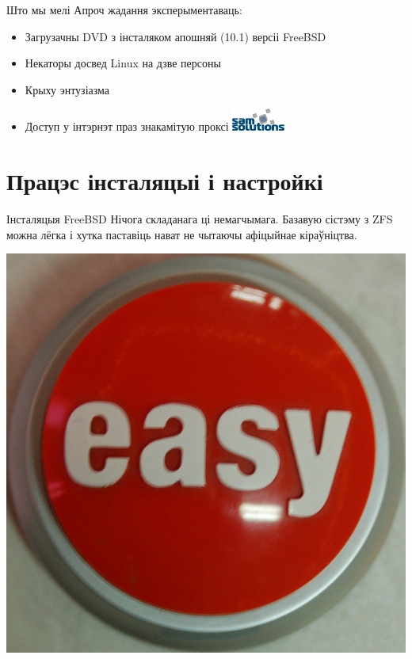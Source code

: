 \documentclass[ignorenonframetext,hyperref={pdftex,unicode}]{beamer}
\begin{document}
\begin{frame}{Што мы мелі} 
	Апроч жадання эксперыментаваць: \pause
	\begin{itemize}
		\item Загрузачны DVD з інсталяком апошняй (10.1) версіі FreeBSD \pause
		\item Некаторы досвед Linux на дзве персоны \pause
		\item Крыху энтузіазма \pause
		\item Доступ у інтэрнэт праз знакамітую проксі { }\includegraphics[height=2em,keepaspectratio]{SaMLogo}
	\end{itemize}
\end{frame} %

\section{Працэс інсталяцыі і настройкі}
\begin{frame}{Інсталяцыя FreeBSD} %
	Нічога складанага ці немагчымага. Базавую сістэму з ZFS можна лёгка і хутка паставіць нават не чытаючы афіцыйнае кіраўніцтва.
	\begin{center}
 		\includegraphics[height=0.5\textheight,keepaspectratio]{338391435_f1e7094228_z} %
	\end{center}
\end{frame} %
\end{document}

